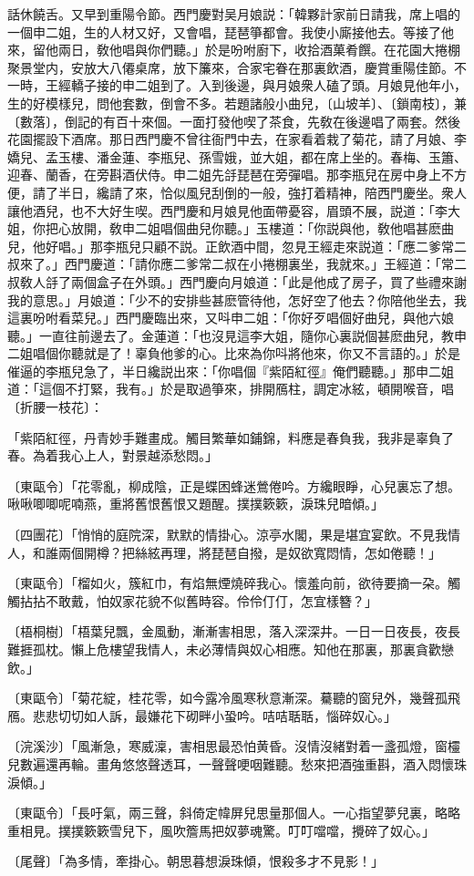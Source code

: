 話休饒舌。又早到重陽令節。西門慶對吴月娘説：「韓夥計家前日請我，席上唱的一個申二姐，生的人材又好，又會唱，琵琶箏都會。我使小廝接他去。等接了他來，留他兩日，敎他唱與你們聽。」於是吩咐廚下，收拾酒菓肴饌。在花園大捲棚聚景堂内，安放大八僊桌席，放下簾來，合家宅眷在那裏飲酒，慶賞重陽佳節。不一時，王經轎子接的申二姐到了。入到後邊，與月娘衆人磕了頭。月娘見他年小，生的好模樣兒，問他套數，倒會不多。若題諸般小曲兒，〔山坡羊〕、〔鎖南枝〕，兼〔數落〕，倒記的有百十來個。一面打發他喫了茶食，先敎在後邊唱了兩套。然後花園擺設下酒席。那日西門慶不曾往衙門中去，在家看着栽了菊花，請了月娘、李嬌兒、孟玉樓、潘金蓮、李瓶兒、孫雪娥，並大姐，都在席上坐的。春梅、玉簫、迎春、蘭香，在旁斟酒伏侍。申二姐先㧱琵琶在旁彈唱。那李瓶兒在房中身上不方便，請了半日，纔請了來，恰似風兒刮倒的一般，強打着精神，陪西門慶坐。衆人讓他酒兒，也不大好生喫。西門慶和月娘見他面帶憂容，眉頭不展，説道：「李大姐，你把心放開，敎申二姐唱個曲兒你聽。」玉樓道：「你説與他，敎他唱甚麽曲兒，他好唱。」那李瓶兒只顧不説。正飲酒中間，忽見王經走來説道：「應二爹常二叔來了。」西門慶道：「請你應二爹常二叔在小捲棚裏坐，我就來。」王經道：「常二叔敎人㧱了兩個盒子在外頭。」西門慶向月娘道：「此是他成了房子，買了些禮來謝我的意思。」月娘道：「少不的安排些甚麽管待他，怎好空了他去？你陪他坐去，我這裏吩咐看菜兒。」西門慶臨出來，又呌申二姐：「你好歹唱個好曲兒，與他六娘聽。」一直往前邊去了。金蓮道：「也沒見這李大姐，隨你心裏説個甚麽曲兒，教申二姐唱個你聽就是了！辜負他爹的心。比來為你呌將他來，你又不言語的。」於是催逼的李瓶兒急了，半日纔説出來：「你唱個『紫陌紅徑』俺們聽聽。」那申二姐道：「這個不打緊，我有。」於是取過箏來，排開鴈柱，調定冰絃，頓開喉音，唱〔折腰一枝花〕：

\begin{myquote}
「紫陌紅徑，丹青妙手難畫成。觸目繁華如鋪錦，料應是春負我，我非是辜負了春。為着我心上人，對景越添愁悶。」

{\markfont〔東甌令〕}「花零亂，柳成陰，正是蝶困蜂迷鶯倦吟。方纔眼睜，心兒裏忘了想。啾啾唧唧呢喃燕，重將舊恨舊恨又題醒。撲撲簌簌，淚珠兒暗傾。」

{\markfont〔四團花〕}「悄悄的庭院深，默默的情掛心。涼亭水閣，果是堪宜宴飲。不見我情人，和誰兩個開樽？把絲絃再理，將琵琶自撥，是奴欲寬悶情，怎如倦聽！」

{\markfont〔東甌令〕}「榴如火，簇紅巾，有焰無煙燒碎我心。懷羞向前，欲待要摘一朶。觸觸拈拈不敢戴，怕奴家花貌不似舊時容。伶伶仃仃，怎宜樣簪？」

{\markfont〔梧桐樹〕}「梧葉兒飄，金風動，漸漸害相思，落入深深井。一日一日夜長，夜長難捱孤枕。懶上危樓望我情人，未必薄情與奴心相應。知他在那裏，那裏貪歡戀飲。」

{\markfont〔東甌令〕}「菊花綻，桂花零，如今露冷風寒秋意漸深。驀聽的窗兒外，幾聲孤飛鴈。悲悲切切如人訴，最嫌花下砌畔小蛩吟。咭咭聒聒，惱碎奴心。」

{\markfont〔浣溪沙〕}「風漸急，寒威澟，害相思最恐怕黄昏。沒情沒緒對着一盞孤燈，窗欞兒數遍還再輪。畫角悠悠聲透耳，一聲聲哽咽難聽。愁來把酒強重斟，酒入悶懷珠淚傾。」

{\markfont〔東甌令〕}「長吁氣，兩三聲，斜倚定幃屏兒思量那個人。一心指望夢兒裏，略略重相見。撲撲簌簌雪兒下，風吹簷馬把奴夢魂驚。叮叮噹噹，攪碎了奴心。」

{\markfont〔尾聲〕}「為多情，牽掛心。朝思暮想淚珠傾，恨殺多才不見影！」
\end{myquote}

